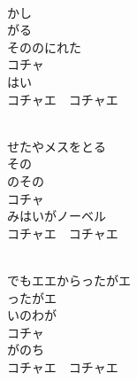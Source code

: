 \documentclass[10pt,b5j]{tarticle} %
\begin{document}
\vspace{1.5em} %
\newcommand{\linespace}{0.5em} %
\newcommand{\blocksize}{0.5\hsize} %
\newcommand{\itemmargin}{3em} %
\begin{enumerate} %
    \setlength{\itemindent}{\itemmargin} %
    \begin{minipage}[c]{\blocksize}
    
        \vspace{\linespace}
        \item~\\
        かし\\
        がる\\
        そののにれた\\
        コチャ\\
        はい\\
        コチャエ　コチャエ
        
    \end{minipage}
    \begin{minipage}[c]{\blocksize}
        
        \vspace{\linespace}
        \item~\\
        せたやメスをとる\\
        その\\
        のその\\
        コチャ\\
        みはいがノーベル\\
        コチャエ　コチャエ
        
    \end{minipage}
    \begin{minipage}[c]{\blocksize}
        
        \vspace{\linespace}
        \item~\\
        でもエエからったがエ\\
        ったがエ\\
        いのわが\\
        コチャ\\
        がのち\\
        コチャエ　コチャエ
        

\end{minipage}
\end{enumerate}
\end{document}
